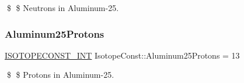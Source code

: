 \$ \$ Neutrons in Aluminum-\/25. \mbox{\label{group___isotope_const-_aluminum-_al25_gaefd094775d7f6441df7e4a4d0bd28e03}} 
\subsubsection{\texorpdfstring{Aluminum25\+Protons}{Aluminum25Protons}}
{\footnotesize\ttfamily \mbox{\hyperlink{group___isotope_const-_macros_ga5f18360b3e99483a35c32d789e62621c}{I\+S\+O\+T\+O\+P\+E\+C\+O\+N\+S\+T\+\_\+\+I\+NT}} Isotope\+Const\+::\+Aluminum25\+Protons = 13}

\$ \$ Protons in Aluminum-\/25. 
